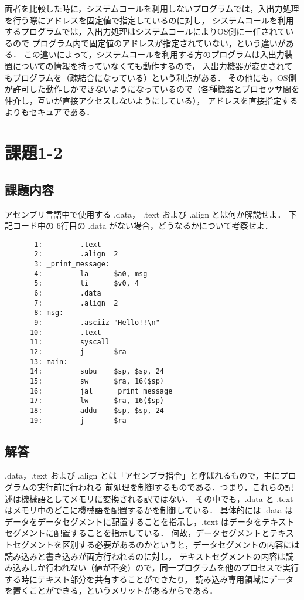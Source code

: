 \documentclass[a4j,11pt]{jarticle}
\begin{document}
両者を比較した時に，システムコールを利用しないプログラムでは，入出力処理を行う際にアドレスを固定値で指定しているのに対し，
システムコールを利用するプログラムでは，入出力処理はシステムコールによりOS側に一任されているので
プログラム内で固定値のアドレスが指定されていない，という違いがある．
この違いによって，システムコールを利用する方のプログラムは入出力装置についての情報を持っていなくても動作するので，
入出力機器が変更されてもプログラムを（疎結合になっている）という利点がある．
その他にも，OS側が許可した動作しかできないようになっているので（各種機器とプロセッサ間を仲介し，互いが直接アクセスしないようにしている），
アドレスを直接指定するよりもセキュアである．

\section{課題1-2}

\subsection{課題内容}
アセンブリ言語中で使用する .data， .text および .align とは何か解説せよ．
 下記コード中の 6行目の .data がない場合，どうなるかについて考察せよ．

\begin{verbatim}
       1:         .text
       2:         .align  2
       3: _print_message:
       4:         la      $a0, msg
       5:         li      $v0, 4
       6:         .data
       7:         .align  2
       8: msg:
       9:         .asciiz "Hello!!\n"
      10:         .text
      11:         syscall
      12:         j       $ra
      13: main:
      14:         subu    $sp, $sp, 24
      15:         sw      $ra, 16($sp)
      16:         jal     _print_message
      17:         lw      $ra, 16($sp)
      18:         addu    $sp, $sp, 24
      19:         j       $ra
\end{verbatim}

\subsection{解答}

.data，.text および .align とは「アセンブラ指令」と呼ばれるもので，主にプログラムの実行前に行われる
前処理を制御するものである．つまり，これらの記述は機械語としてメモリに変換される訳ではない．
その中でも，.data と .text はメモリ中のどこに機械語を配置するかを制御している．
具体的には .data はデータをデータセグメントに配置することを指示し，.text はデータをテキストセグメントに配置することを指示している．
何故，データセグメントとテキストセグメントを区別する必要があるのかというと，データセグメントの内容には読み込みと書き込みが両方行われるのに対し，
テキストセグメントの内容は読み込みしか行われない（値が不変）ので，同一プログラムを他のプロセスで実行する時にテキスト部分を共有することができたり，
読み込み専用領域にデータを置くことができる，というメリットがあるからである．
\end{document}
